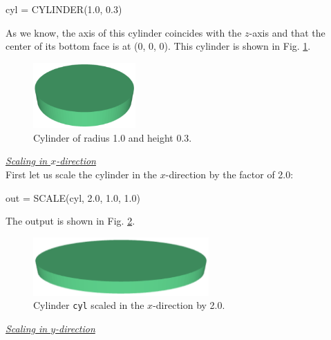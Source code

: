 \begin{bluecode}
cyl = CYLINDER(1.0, 0.3)
\end{bluecode}
As we know, the axis of this cylinder coincides with the $z$-axis 
and that the center of its bottom face is at (0, 0, 0). This cylinder is shown 
in Fig. \ref{fig:scale-0}.

\begin{figure}[!ht]
\begin{center}
\includegraphics[width=0.35\textwidth]{img/scale-0.png}
\end{center}
\vspace{-4mm}
\caption{Cylinder of radius 1.0 and height 0.3.}
\label{fig:scale-0}
\end{figure}

\noindent
\underline{\em Scaling in $x$-direction}\\

First let us scale the cylinder in the $x$-direction by the factor of 2.0: 

\begin{bluecode}
out = SCALE(cyl, 2.0, 1.0, 1.0)
\end{bluecode}
\newpage
\noindent
The output is shown in Fig. \ref{fig:scale-1}.

\begin{figure}[!ht]
\begin{center}
\includegraphics[width=0.6\textwidth]{img/scale-1.png}
\end{center}
\vspace{-4mm}
\caption{Cylinder {\tt cyl} scaled in the $x$-direction by 2.0.}
\label{fig:scale-1}
\end{figure}

\noindent
\underline{\em Scaling in $y$-direction}\\

